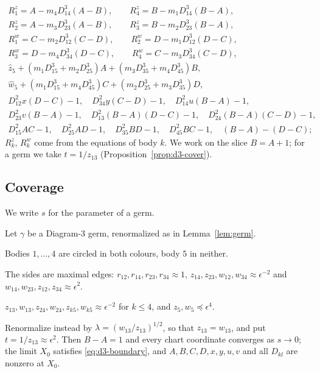\begin{equation}\label{eq:d3-boundary}
\begin{gathered}
R^z_1=A-m_4D_{14}^3(A-B),\qquad R^z_4=B-m_1D_{14}^3(B-A),\\
R^z_2=A-m_3D_{23}^3(A-B),\qquad R^z_3=B-m_2D_{23}^3(B-A),\\
R^w_1=C-m_2D_{12}^3(C-D),\qquad R^w_2=D-m_1D_{12}^3(D-C),\\
R^w_3=D-m_4D_{34}^3(D-C),\qquad R^w_4=C-m_3D_{34}^3(C-D),\\
\hat z_5+(m_1D_{15}^3+m_2D_{25}^3)A+(m_3D_{35}^3+m_4D_{45}^3)B,\\
\hat w_5+(m_1D_{15}^3+m_4D_{45}^3)C+(m_2D_{25}^3+m_3D_{35}^3)D,\\
D_{12}^2x(D-C)-1,\quad D_{34}^2y(C-D)-1,\quad D_{14}^2u(B-A)-1,\\
D_{23}^2v(B-A)-1,\quad D_{13}^2(B-A)(D-C)-1,\quad D_{24}^2(B-A)(C-D)-1,\\
D_{15}^2AC-1,\quad D_{25}^2AD-1,\quad D_{35}^2BD-1,\quad D_{45}^2BC-1,\quad (B-A)-(D-C);
\end{gathered}
\end{equation}
$R^z_k$, $R^w_k$ come from the equations of body $k$.  We work on the slice $B=A+1$; for a germ
we take $t=1/z_{13}$ (Proposition~\ref{prop:d3-cover}).

\subsection{Coverage}
We write $s$ for the parameter of a germ.

\begin{proposition}[Coverage]\label{prop:d3-cover}
Let $\gamma$ be a Diagram-3 germ, renormalized as in Lemma~\ref{lem:germ}.
\begin{romanlist}
  \item Bodies $1,\dots,4$ are circled in both colours, body $5$ in neither.
  \item The sides are maximal edges: $r_{12},r_{14},r_{23},r_{34}\approx1$,
  $z_{14},z_{23},w_{12},w_{34}\approx\epsilon^{-2}$ and $w_{14},w_{23},z_{12},z_{34}\approx\epsilon^2$.
  \item $z_{13},w_{13},z_{24},w_{24},z_{k5},w_{k5}\approx\epsilon^{-2}$ for $k\le4$, and
  $z_5,w_5\preccurlyeq\epsilon^4$.
  \item Renormalize instead by $\lambda=(w_{13}/z_{13})^{1/2}$, so that $z_{13}=w_{13}$, and put
  $t=1/z_{13}\approx\epsilon^2$.  Then $B-A=1$ and every chart coordinate converges as $s\to0$; the
  limit $X_0$ satisfies \eqref{eq:d3-boundary}, and $A,B,C,D,x,y,u,v$ and all $D_{kl}$ are
  nonzero at $X_0$.
\end{romanlist}
\end{proposition}


